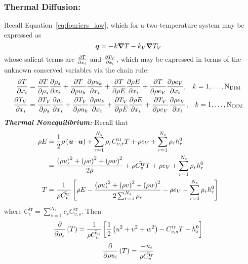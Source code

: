 \subsubsection*{Thermal Diffusion:} Recall Equation~\eqref{eq:fouriers_law}, which for a two-temperature system may be expressed as
\begin{equation*}
  {\boldsymbol{q}} = -k{\boldsymbol{\nabla}} {T} - k_V{\boldsymbol{\nabla}} {T_V}
\end{equation*}
whose salient terms are ${\frac{\partial{T}}{\partial{x_i}}}$ and ${\frac{\partial{T_V}}{\partial{x_i}}}$, which may be expressed in terms of the unknown conserved variables via the chain rule:
\begin{align}
  \label{eq:pdv_T_xi}
  {\frac{\partial{T}}{\partial{x_i}}} &= {\frac{\partial{T}}{\partial{\rho_s}}}{\frac{\partial{\rho_s}}{\partial{x_i}}} + {\frac{\partial{T}}{\partial{\rho u_k}}}{\frac{\partial{\rho u_k}}{\partial{x_i}}} + {\frac{\partial{T}}{\partial{\rho E}}}{\frac{\partial{\rho E}}{\partial{x_i}}} + {\frac{\partial{T}}{\partial{\rho e_V}}}{\frac{\partial{\rho e_V}}{\partial{x_i}}}, \;\;\; k=1,\ldots,\text{N}_{\text{DIM}} \\
  \label{eq:pdv_Tv_xi}
  {\frac{\partial{T_V}}{\partial{x_i}}} &= {\frac{\partial{T_V}}{\partial{\rho_s}}}{\frac{\partial{\rho_s}}{\partial{x_i}}} + {\frac{\partial{T_V}}{\partial{\rho u_k}}}{\frac{\partial{\rho u_k}}{\partial{x_i}}} + {\frac{\partial{T_V}}{\partial{\rho E}}}{\frac{\partial{\rho E}}{\partial{x_i}}} + {\frac{\partial{T_V}}{\partial{\rho e_V}}}{\frac{\partial{\rho e_V}}{\partial{x_i}}}, \;\;\; k=1,\ldots,\text{N}_{\text{DIM}}
\end{align}
\textbf{\emph{Thermal Nonequilibrium:}}
Recall that
\begin{align}
  \rho E &= \frac{1}{2}\rho\left({\boldsymbol{u}}\cdot{\boldsymbol{u}}\right) + \sum_{r=1}^{N_s} \rho_r C^{\text{tr}}_{v,r} T + \rho e_V  + \sum_{r=1}^{N_s} \rho_r h^0_r \nonumber \\
         &= \frac{\left(\rho u\right)^2+\left(\rho v\right)^2+\left(\rho w\right)^2}{2 \rho} + \rho \bar{C^{\text{tr}}_v} T + \rho e_V  + \sum_{r=1}^{N_s} \rho_r h^0_r \nonumber \\
       T &= \frac{1}{\rho \bar{C^{\text{tr}}_v}}\left[\rho E - \frac{\left(\rho u\right)^2+\left(\rho v\right)^2+\left(\rho w\right)^2}{2 \sum_{r=1}^{N_s}\rho_r} - \rho e_V  - \sum_{r=1}^{N_s} \rho_r h^0_r\right] \label{eq:temperature_noneq}
\end{align}
where $\bar{C^{\text{tr}}_v}=\sum_{s=1}^{N_s} c_s C^{\text{tr}}_{v,s}$. Then
\begin{equation}
  \label{eq:pdv_T_rhos_noneq}
  {\frac{\partial{}}{\partial{\rho_s}}}\left(T\right) = \frac{1}{\rho\bar{C^{\text{tr}}_v}}\left[\frac{1}{2}\left(u^2 + v^2 +w^2\right) - C^{\text{tr}}_{v,s}T - h^0_s\right]
\end{equation}
\begin{equation}
  {\frac{\partial{}}{\partial{\rho u_i}}}\left(T\right) = \frac{-u_i}{\rho\bar{C^{\text{tr}}_v}}
\end{equation}
